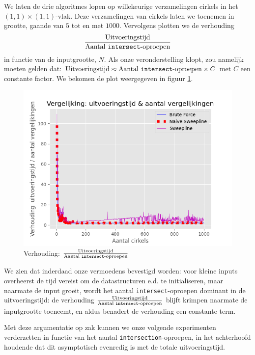 \documentclass[12pt]{article}
\begin{document}
We laten de drie algoritmes lopen op willekeurige verzamelingen cirkels in het $ (1,1) \times (1,1)$-vlak. Deze verzamelingen van cirkels laten we toenemen in grootte, gaande van $5$ tot en met $1000$. Vervolgens plotten we de verhouding $$\frac{\text{Uitvoeringstijd}}{\text{Aantal \texttt{intersect}-oproepen}}$$ in functie van de inputgrootte, $N$. Als onze veronderstelling klopt, zou namelijk moeten gelden dat: $\text{Uitvoeringstijd} \approx \text{Aantal \texttt{intersect}-oproepen} \times C$ met $C$ een constante factor. We bekomen de plot weergegeven in figuur \ref{fig:verhouding}. 

\begin{figure}[H]
	\centering
	\includegraphics[width=\linewidth]{../plots/ExecutionTimesToCompares.png}
	\caption{Verhouding: $\frac{\text{Uitvoeringstijd}}{\text{Aantal \texttt{intersect}-oproepen}}$}
	\label{fig:verhouding}
\end{figure}

We zien dat inderdaad onze vermoedens bevestigd worden: voor kleine inputs overheerst de tijd vereist om de datastructuren e.d. te initialiseren, maar naarmate de input groeit, wordt het aantal \texttt{intersect}-oproepen dominant in de uitvoeringstijd: de verhouding $\frac{\text{Uitvoeringstijd}}{\text{Aantal \texttt{intersect}-oproepen}}$ blijft krimpen naarmate de inputgrootte toeneemt, en aldus benadert de verhouding een constante term.

Met deze argumentatie op zak kunnen we onze volgende experimenten verderzetten in functie van het aantal \texttt{intersection}-oproepen, in het achterhoofd houdende dat dit asymptotisch evenredig is met de totale uitvoeringstijd.
\end{document}
